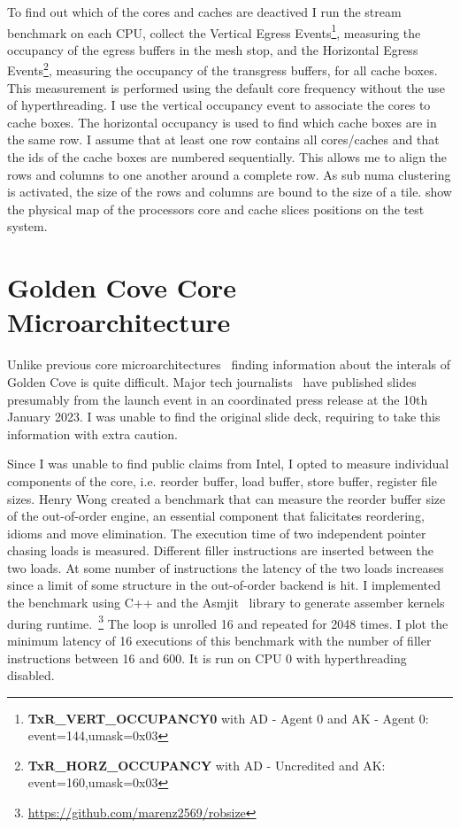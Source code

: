 To find out which of the cores and caches are deactived I run the stream benchmark on each CPU, collect the Vertical Egress Events\footnote{\textbf{TxR\_VERT\_OCCUPANCY0} with AD - Agent 0 and AK - Agent 0: event=144,umask=0x03}, measuring the occupancy of the egress buffers in the mesh stop, and the Horizontal Egress Events\footnote{\textbf{TxR\_HORZ\_OCCUPANCY} with AD - Uncredited and AK: event=160,umask=0x03}, measuring the occupancy of the transgress buffers, for all cache boxes.
This measurement is performed using the default core frequency without the use of hyperthreading.
I use the vertical occupancy event to associate the cores to cache boxes.
The horizontal occupancy is used to find which cache boxes are in the same row.
I assume that at least one row contains all cores/caches and that the ids of the cache boxes are numbered sequentially.
This allows me to align the rows and columns to one another around a complete row.
As sub numa clustering is activated, the size of the rows and columns are bound to the size of a tile.
 show the physical map of the processors core and cache slices positions on the test system.

\section{Golden Cove Core Microarchitecture}

Unlike previous core microarchitectures~\cite{Intel_2020_Skylake_SP,Intel_2020_IceLake_SP} finding information about the interals of Golden Cove is quite difficult.
Major tech journalists~\cite{ServerTheHome_2023_SPR_Press,TechGage_2023_SPR_Press,HotHardware_2023_SPR_Press,Wccftech_2023_SPR_Press} have published slides presumably from the launch event in an coordinated press release at the 10th January 2023.
I was unable to find the original slide deck, requiring to take this information with extra caution.

Since I was unable to find public claims from Intel, I opted to measure individual components of the core, i.e. reorder buffer, load buffer, store buffer, register file sizes.
Henry Wong created a benchmark that can measure the reorder buffer size~\cite{Wong_2013_robsize} of the out-of-order engine, an essential component that falicitates reordering, idioms and move elimination.
The execution time of two independent pointer chasing loads is measured.
Different filler instructions are inserted between the two loads.
At some number of instructions the latency of the two loads increases since a limit of some structure in the out-of-order backend is hit.
I implemented the benchmark using C++ and the Asmjit~\cite{Kobalicek_AsmJit} library to generate assember kernels during runtime.~\footnote{\url{https://github.com/marenz2569/robsize}}
The loop is unrolled \SI{16}{} and repeated for \SI{2048}{} times.
I plot the minimum latency of \SI{16}{} executions of this benchmark with the number of filler instructions between \SI{16}{} and \SI{600}{}.
It is run on CPU 0 with hyperthreading disabled.

